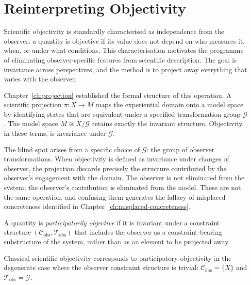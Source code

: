 \documentclass[11pt,openany]{book}
\begin{document}
\section{Reinterpreting Objectivity}
\label{sec:objectivity}

Scientific objectivity is standardly characterised as
independence from the observer: a quantity is objective if
its value does not depend on who measures it, when, or
under what conditions.  This characterisation motivates the
programme of eliminating observer-specific features from
scientific description.  The goal is invariance across
perspectives, and the method is to project away everything
that varies with the observer.

Chapter~\ref{ch:projection} established the formal
structure of this operation.  A scientific projection
$\pi : X \to M$ maps the experiential domain onto a model
space by identifying states that are equivalent under a
specified transformation group $\mathcal{G}$.  The model
space $M \cong X / \mathcal{G}$ retains exactly the
invariant structure.  Objectivity, in these terms, is
invariance under $\mathcal{G}$.

The blind spot arises from a specific choice of
$\mathcal{G}$: the group of observer transformations.
When objectivity is defined as invariance under changes of
observer, the projection discards precisely the structure
contributed by the observer's engagement with the domain.
The observer is not eliminated from the system; the
observer's contribution is eliminated from the model.
These are not the same operation, and confusing them
generates the fallacy of misplaced concreteness identified
in Chapter~\ref{ch:misplaced-concreteness}.

\begin{definition}
\label{def:participatory-objectivity}
A quantity is \emph{participatorily objective} if it is
invariant under a constraint structure
$(\mathcal{C}_{\mathrm{obs}}, \mathcal{T}_{\mathrm{obs}})$
that includes the observer as a constraint-bearing
substructure of the system, rather than as an element to
be projected away.
\end{definition}

\begin{proposition}
\label{prop:classical-special-case}
Classical scientific objectivity corresponds to
participatory objectivity in the degenerate case where the
observer constraint structure is trivial:
$\mathcal{C}_{\mathrm{obs}} = \{X\}$ and
$\mathcal{T}_{\mathrm{obs}} = \mathcal{G}$.
\end{proposition}
\end{document}
